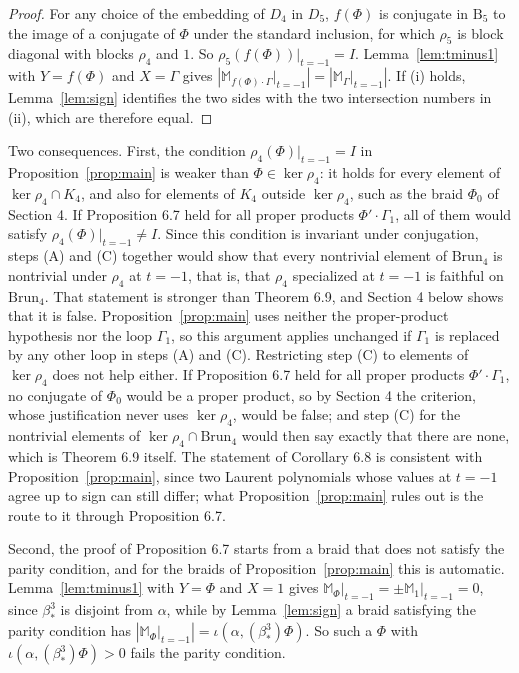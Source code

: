 \documentclass[11pt]{amsart}
\theoremstyle{remark}
\newcommand{\M}{\mathbb{M}}
\newcommand{\B}{\mathrm{B}}
\newcommand{\Brun}{\mathrm{Brun}}
\newcommand{\bs}{\beta^3_*}
\newcommand{\at}{\big|_{t=-1}}
\begin{document}
\begin{proof}
For any choice of the embedding of $D_4$ in $D_5$, $f(\Phi)$ is conjugate in $\B_5$ to the image of a conjugate of $\Phi$ under the standard inclusion, for which $\rho_5$ is block diagonal with blocks $\rho_4$ and $1$. So $\rho_5(f(\Phi))\at=I$. Lemma~\ref{lem:tminus1} with $Y=f(\Phi)$ and $X=\Gamma$ gives $|\M_{f(\Phi)\cdot\Gamma}\at|=|\M_\Gamma\at|$. If (i) holds, Lemma~\ref{lem:sign} identifies the two sides with the two intersection numbers in (ii), which are therefore equal.
\end{proof}

Two consequences. First, the condition $\rho_4(\Phi)\at=I$ in Proposition~\ref{prop:main} is weaker than $\Phi\in\ker\rho_4$: it holds for every element of $\ker\rho_4\cap K_4$, and also for elements of $K_4$ outside $\ker\rho_4$, such as the braid $\Phi_0$ of Section 4. If Proposition 6.7 held for all proper products $\Phi'\cdot\Gamma_1$, all of them would satisfy $\rho_4(\Phi)\at\neq I$. Since this condition is invariant under conjugation, steps (A) and (C) together would show that every nontrivial element of $\Brun_4$ is nontrivial under $\rho_4$ at $t=-1$, that is, that $\rho_4$ specialized at $t=-1$ is faithful on $\Brun_4$. That statement is stronger than Theorem 6.9, and Section 4 below shows that it is false. Proposition~\ref{prop:main} uses neither the proper-product hypothesis nor the loop $\Gamma_1$, so this argument applies unchanged if $\Gamma_1$ is replaced by any other loop in steps (A) and (C). Restricting step (C) to elements of $\ker\rho_4$ does not help either. If Proposition 6.7 held for all proper products $\Phi'\cdot\Gamma_1$, no conjugate of $\Phi_0$ would be a proper product, so by Section 4 the criterion, whose justification never uses $\ker\rho_4$, would be false; and step (C) for the nontrivial elements of $\ker\rho_4\cap\Brun_4$ would then say exactly that there are none, which is Theorem 6.9 itself. The statement of Corollary 6.8 is consistent with Proposition~\ref{prop:main}, since two Laurent polynomials whose values at $t=-1$ agree up to sign can still differ; what Proposition~\ref{prop:main} rules out is the route to it through Proposition 6.7.

Second, the proof of Proposition 6.7 starts from a braid that does not satisfy the parity condition, and for the braids of Proposition~\ref{prop:main} this is automatic. Lemma~\ref{lem:tminus1} with $Y=\Phi$ and $X=1$ gives $\M_\Phi\at=\pm\M_1\at=0$, since $\bs$ is disjoint from $\alpha$, while by Lemma~\ref{lem:sign} a braid satisfying the parity condition has $|\M_\Phi\at|=\iota(\alpha,(\bs)\Phi)$. So such a $\Phi$ with $\iota(\alpha,(\bs)\Phi)>0$ fails the parity condition.
\end{document}
